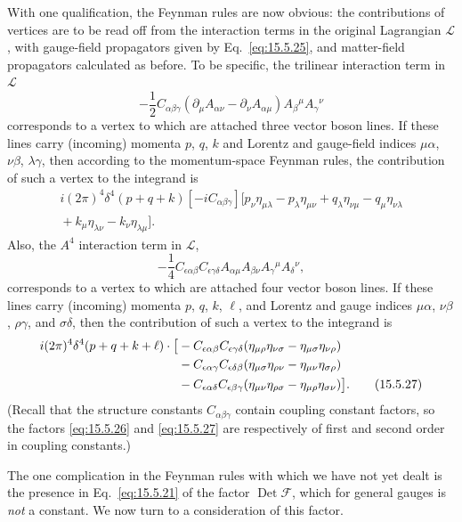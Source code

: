 With one qualification, the Feynman rules are now obvious: the contributions
of vertices are to be read off from the interaction terms in the original
Lagrangian $\mathcal L$, with gauge-field propagators given by
Eq.~\eqref{eq:15.5.25}, and matter-field propagators calculated as before. To
be specific, the trilinear interaction term in $\mathcal L$
\begin{equation*}
  -\frac12C_{\alpha\beta\gamma}
  (\partial_\mu A_{\alpha\nu}-\partial_\nu A_{\alpha\mu})
  A_\beta{}^\mu A_\gamma{}^\nu
\end{equation*}
corresponds to a vertex to which are attached three vector boson lines. If
these lines carry (incoming) momenta $p$, $q$, $k$ and Lorentz and gauge-field
indices $\mu\alpha$, $\nu\beta$, $\lambda\gamma$, then according to the
momentum-space Feynman rules, the contribution of such a vertex to the
integrand is
\begin{multline}
  i(2\pi)^4\delta^4(p+q+k)[-iC_{\alpha\beta\gamma}]
  \bigl[p_\nu\eta_{\mu\lambda}-p_\lambda\eta_{\mu\nu}
  +q_\lambda\eta_{\nu\mu}-q_\mu\eta_{\nu\lambda}\\
  {}+k_\mu\eta_{\lambda\nu}-k_\nu\eta_{\lambda\mu}\bigr].
  \tag{15.5.26}\label{eq:15.5.26}
\end{multline}
Also, the $A^4$ interaction term in $\mathcal L$,
\begin{equation*}
  -\frac14C_{\epsilon\alpha\beta}C_{\epsilon\gamma\delta}
  A_{\alpha\mu}A_{\beta\nu}A_\gamma{}^\mu A_\delta{}^\nu,
\end{equation*}
corresponds to a vertex to which are attached four vector boson lines. If these
lines carry (incoming) momenta $p$, $q$, $k$, $\ell$, and Lorentz and gauge
indices $\mu\alpha$, $\nu\beta$, $\rho\gamma$, and $\sigma\delta$, then the
contribution of such a vertex to the integrand is
\begin{align}
  i(2\pi)^4\delta^4(p+q+k+\ell)\mathbin{\cdot}
  \bigl[{}&-C_{\epsilon\alpha\beta}C_{\epsilon\gamma\delta}
  (\eta_{\mu\rho}\eta_{\nu\sigma}-\eta_{\mu\sigma}\eta_{\nu\rho})
  \notag\\
  &-C_{\epsilon\alpha\gamma}C_{\epsilon\delta\beta}
  (\eta_{\mu\sigma}\eta_{\rho\nu}-\eta_{\mu\nu}\eta_{\sigma\rho})
  \notag\\
  &-C_{\epsilon\alpha\delta}C_{\epsilon\beta\gamma}
  (\eta_{\mu\nu}\eta_{\rho\sigma}-\eta_{\mu\rho}\eta_{\sigma\nu})\bigr].
  \tag{15.5.27}\label{eq:15.5.27}
\end{align}
(Recall that the structure constants $C_{\alpha\beta\gamma}$ contain coupling
constant factors, so the factors \eqref{eq:15.5.26} and \eqref{eq:15.5.27} are
respectively of first and second order in coupling constants.)

The one complication in the Feynman rules with which we have not yet dealt is
the presence in Eq.~\eqref{eq:15.5.21} of the factor
$\operatorname{Det}\mathcal F$, which for general gauges is \emph{not} a
constant. We now turn to a consideration of this factor.
